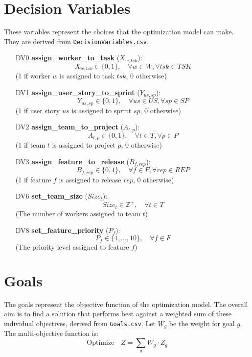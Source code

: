\documentclass[11pt]{article}
\begin{document}
\section{Decision Variables}
These variables represent the choices that the optimization model can make. They are derived from \texttt{DecisionVariables.csv}.
\begin{itemize}
    \item [DV0] \textbf{assign\_worker\_to\_task} ($X_{w, tsk}$):
    $$ X_{w, tsk} \in \{0, 1\}, \quad \forall w \in W, \forall tsk \in TSK $$
    (1 if worker $w$ is assigned to task $tsk$, 0 otherwise)

    \item [DV1] \textbf{assign\_user\_story\_to\_sprint} ($Y_{us, sp}$):
    $$ Y_{us, sp} \in \{0, 1\}, \quad \forall us \in US, \forall sp \in SP $$
    (1 if user story $us$ is assigned to sprint $sp$, 0 otherwise)

    \item [DV2] \textbf{assign\_team\_to\_project} ($A_{t, p}$):
    $$ A_{t, p} \in \{0, 1\}, \quad \forall t \in T, \forall p \in P $$
    (1 if team $t$ is assigned to project $p$, 0 otherwise)

    \item [DV3] \textbf{assign\_feature\_to\_release} ($B_{f, rep}$):
    $$ B_{f, rep} \in \{0, 1\}, \quad \forall f \in F, \forall rep \in REP $$
    (1 if feature $f$ is assigned to release $rep$, 0 otherwise)
    
    \item [DV6] \textbf{set\_team\_size} ($Size_t$):
    $$ Size_t \in \mathbb{Z}^+, \quad \forall t \in T $$
    (The number of workers assigned to team $t$)

    \item [DV8] \textbf{set\_feature\_priority} ($P_f$):
    $$ P_f \in \{1, ..., 10\}, \quad \forall f \in F $$
    (The priority level assigned to feature $f$)
\end{itemize}

\section{Goals}
The goals represent the objective function of the optimization model. The overall aim is to find a solution that performs best against a weighted sum of these individual objectives, derived from \texttt{Goals.csv}. Let $W_g$ be the weight for goal $g$. The multi-objective function is:
$$ \text{Optimize} \quad Z = \sum_{g} W_g \cdot Z_g $$
\end{document}
